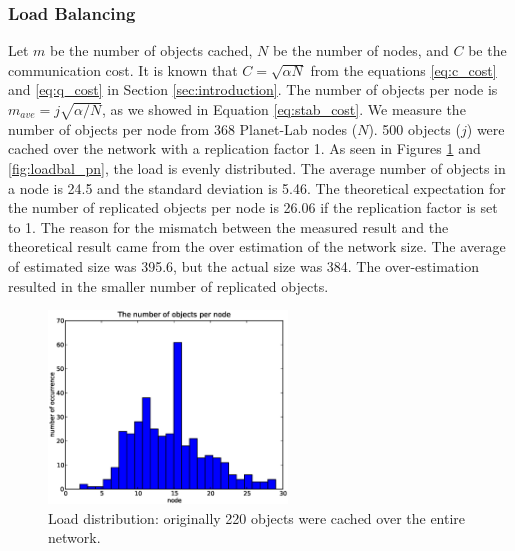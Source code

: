 \documentclass[9.5pt,journal,final,finalsubmission,twocolumn]{IEEEtran}
\begin{document}

\subsubsection{Load Balancing}
Let $m$ be the number of objects cached, $N$ be the number of nodes, and 
$C$ be the communication cost. It is known that $C=\sqrt{\alpha N}$ from 
the equations \eqref{eq:c_cost} and \eqref{eq:q_cost} in Section 
\ref{sec:introduction}.
The number of objects per node is $m_{ave}=j\sqrt{\alpha/N}$, as we
showed in Equation \ref{eq:stab_cost}. 
We measure the number of objects per node from 368 Planet-Lab nodes ($N$).
500 objects ($j$) were cached over the network with a replication 
factor 1.
As seen in Figures \ref{fig:loadbal_hist} and \ref{fig:loadbal_pn}, 
the load is evenly distributed. 
The average number of objects in a node is 24.5 and the standard deviation 
is 5.46.
The theoretical expectation for the number of replicated objects per node
is 26.06 if the replication factor is set to 1.
The reason for the mismatch between the measured result and the theoretical 
result came from the over estimation of the network size. 
The average of estimated size was 395.6, but the actual size was 384.
The over-estimation resulted in the smaller number of replicated objects.
\begin{figure}[ht]
\includegraphics[width=2.5in]{load_bal_hist.eps}
\caption{Load distribution: originally 220 objects were cached over the entire network. } \label{fig:loadbal_hist}
\end{figure}
\end{document}
